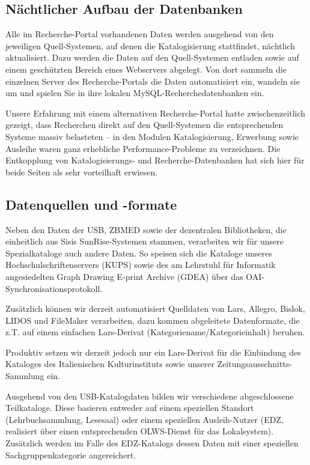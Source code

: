\documentclass[11pt, twoside, a4paper, BCOR8mm, DIV12, bibtotoc,idxtotoc]{scrbook}
\begin{document}
\subsection{Nächtlicher Aufbau der Datenbanken}
Alle im Recherche-Portal vorhandenen Daten werden ausgehend von den
jeweiligen Quell-Sys\-te\-men, auf denen die Katalogisierung stattfindet,
nächtlich aktualisiert. Dazu werden die Daten auf den Quell-Systemen
entladen sowie auf einem geschützten Bereich eines Webservers
abgelegt. Von dort sammeln die einzelnen Server des Recherche-Portals
die Daten automatisiert ein, wandeln sie um und spielen Sie in ihre
lokalen MySQL-Recherchedatenbanken ein.

Unsere Erfahrung mit einem alternativen Recherche-Portal hatte
zwischenzeitlich gezeigt, dass Recherchen direkt auf den
Quell-Systemen die entsprechenden Systeme massiv belasteten -- in den
Modulen Katalogisierung, Erwerbung sowie Ausleihe waren ganz
erhebliche Performance-Probleme zu verzeichnen. Die Entkopplung von
Katalogisierungs- und Recherche-Datenbanken hat sich hier für beide
Seiten als sehr vorteilhaft erwiesen.


\subsection{Datenquellen und -formate}
Neben den Daten der USB, ZBMED sowie der dezentralen Bibliotheken, die
einheitlich aus Sisis SunRise-Systemen stammen, verarbeiten wir für
unsere Spezialkataloge auch andere Daten. So speisen sich die Kataloge unseres
Hochschulschriftenservers (KUPS) sowie des am Lehrstuhl für Informatik
angesiedelten Graph Drawing E-print Archive (GDEA) über das
OAI-Syn\-chro\-ni\-sa\-tions\-pro\-to\-koll.

Zusätzlich können wir derzeit automatisiert Quelldaten von Lars,
Allegro, Bislok, LIDOS und FileMaker verarbeiten, dazu kommen
abgeleitete Datenformate, die z.T. auf einem einfachen Lars-Derivat
(Kategoriename/Kategorieinhalt) beruhen.

Produktiv setzen wir derzeit jedoch nur ein Lars-Derivat für die
Einbindung des Kataloges des Italienischen Kulturinstituts sowie
unserer Zeitungsausschnitts-Sammlung ein.


Ausgehend von den USB-Katalogdaten bilden wir verschiedene
abgeschlossene Teilkataloge. Diese basieren entweder auf einem
spe\-ziel\-len Standort (Lehrbuchsammlung, Lesesaal) oder einem spe\-ziel\-len
Ausleih-Nutzer (EDZ, realisiert über einen entsprechenden OLWS-Dienst
für das Lokal\-sys\-tem). Zusätzlich werden im Falle des EDZ-Katalogs
dessen Daten mit einer spe\-ziel\-len Sach\-gruppen\-ka\-te\-go\-rie angereichert.
\end{document}
